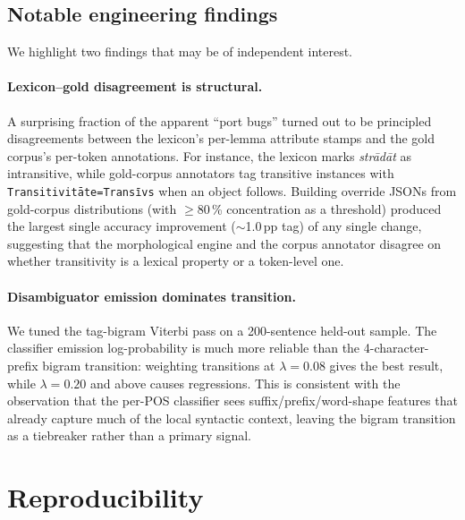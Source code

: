 \documentclass[11pt,a4paper]{article}
\begin{document}
\subsection{Notable engineering findings}

We highlight two findings that may be of independent interest.

\paragraph{Lexicon--gold disagreement is structural.} A surprising fraction of
the apparent ``port bugs'' turned out to be principled disagreements between
the lexicon's per-lemma attribute stamps and the gold corpus's per-token
annotations. For instance, the lexicon marks \textit{strādāt} as
intransitive, while gold-corpus annotators tag transitive instances with
\texttt{Transitivit\=ate=Trans\=\i vs} when an object follows. Building override
JSONs from gold-corpus distributions (with $\geq$80\,\% concentration as a
threshold) produced the largest single accuracy improvement
($\sim$1.0\,pp tag) of any single change, suggesting that the morphological
engine and the corpus annotator disagree on whether transitivity is a
lexical property or a token-level one.

\paragraph{Disambiguator emission dominates transition.} We tuned the
tag-bigram Viterbi pass on a 200-sentence held-out sample. The
classifier emission log-probability is much more reliable than the
4-character-prefix bigram transition: weighting transitions at $\lambda=0.08$
gives the best result, while $\lambda=0.20$ and above causes regressions.
This is consistent with the observation that the per-POS classifier sees
suffix/prefix/word-shape features that already capture much of the local
syntactic context, leaving the bigram transition as a tiebreaker rather than
a primary signal.

\section{Reproducibility}
\end{document}
